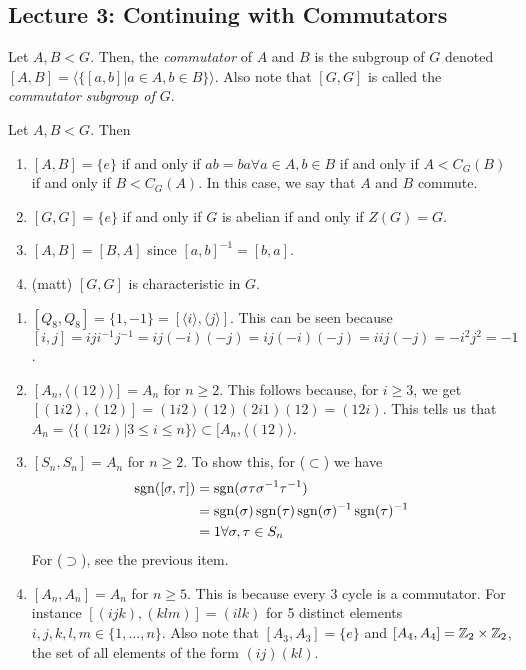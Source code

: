 \documentclass[11pt,leqno,oneside]{amsart}
\newcommand{\subgroup}{\mathrel{<}}
\begin{document}
\subsection*{Lecture 3: Continuing with Commutators}
\begin{defn}
    Let $A, B \subgroup G$. Then, the \emph{commutator} of $A$ and $B$ is the
    subgroup of $G$ denoted $[A,B] = \langle \{[a,b] | a \in A, b \in B\}
    \rangle$. Also note that $[G,G]$ is called the \emph{commutator subgroup of
    $G$}.
\end{defn}
\begin{rmk}
    Let $A,B \subgroup G$. Then
    \begin{enumerate}
        \item $[A,B] = \{e\}$ if and only if $ab = ba \forall a \in A, b \in B$
            if and only if $A \subgroup C_G(B)$ if and only if $B \subgroup
            C_G(A)$. In this case, we say that $A$ and $B$ commute.
        \item $[G,G] = \{e\}$ if and only if $G$ is abelian if and only if $Z(G) = G$.
        \item $[A,B] = [B,A]$ since $[a,b]^{-1} = [b,a]$.
        \item (matt) $[G,G]$ is characteristic in $G$.
    \end{enumerate}
\end{rmk}
\begin{example}
    \begin{enumerate}
        \item $[Q_8,Q_8] = \{1,-1\} = [\langle i \rangle, \langle j \rangle]$.
            This can be seen because $[i,j] = iji^{-1}j^{-1} = ij(-i)(-j) =
            ij(-i)(-j) = iij(-j) = -i^2j^2 = -1$.
        \item $[A_n, \langle (12) \rangle] = A_n$ for $n \geq 2$. This follows
            because, for $i \geq 3$, we get $[(1i2),(12)] = (1i2)(12)(2i1)(12)
            = (12i)$. This tells us that $A_n = \langle \{(12i) | 3 \leq i \leq
            n\} \rangle \subset [A_n, \langle (12)\rangle$.
        \item $[S_n,S_n] = A_n$ for $n \geq 2$. To show this, for ($\subset$)
            we have \begin{align*}
                \operatorname{sgn}( [\sigma,\tau] ) & = \operatorname{sgn}(\sigma \tau \sigma^{-1} \tau^{-1}) \\
                \ & = \operatorname{sgn}(\sigma) \operatorname{sgn}(\tau) \operatorname{sgn}(\sigma)^{-1} \operatorname{sgn}(\tau)^{-1} \\
                \ & = 1 \forall \sigma, \tau \in S_n
            \end{align*}
            For ($\supset$), see the previous item.
        \item $[A_n,A_n] = A_n$ for $n \geq 5$. This is because every 3 cycle
            is a commutator. For instance $[(ijk),(klm)] = (ilk)$ for 5
            distinct elements $i,j,k,l,m \in \{1, \ldots, n\}$. Also note that
            $[A_3,A_3] = \{e\}$ and $[A_4,A_4] = {\mathbb Z}_2 \times {\mathbb Z}_2$, the set of
            all elements of the form $(ij)(kl)$.
    \end{enumerate}
\end{example}
\end{document}
